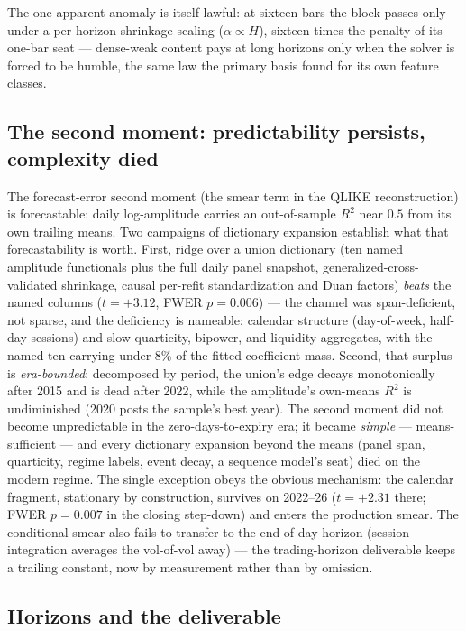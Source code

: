 The one apparent anomaly is itself lawful: at sixteen bars the block passes
only under a per-horizon shrinkage scaling ($\alpha \propto H$), sixteen times
the penalty of its one-bar seat --- dense-weak content pays at long horizons
only when the solver is forced to be humble, the same law the primary basis
found for its own feature classes.

\subsection{The second moment: predictability persists, complexity died}
\label{sec:second-moment}

The forecast-error second moment (the smear term in the QLIKE
reconstruction) is forecastable: daily log-amplitude carries an
out-of-sample $R^2$ near $0.5$ from its own trailing means. Two campaigns of
dictionary expansion establish what that forecastability is worth. First,
ridge over a union dictionary (ten named amplitude functionals plus the full
daily panel snapshot, generalized-cross-validated shrinkage, causal
per-refit standardization and Duan factors) \emph{beats} the named columns
($t = +3.12$, FWER $p = 0.006$) --- the channel was span-deficient, not
sparse, and the deficiency is nameable: calendar structure (day-of-week,
half-day sessions) and slow quarticity, bipower, and liquidity aggregates,
with the named ten carrying under 8\% of the fitted coefficient mass. Second,
that surplus is \emph{era-bounded}: decomposed by period, the union's edge
decays monotonically after 2015 and is dead after 2022, while the amplitude's
own-means $R^2$ is undiminished (2020 posts the sample's best year). The
second moment did not become unpredictable in the zero-days-to-expiry era; it
became \emph{simple} --- means-sufficient --- and every dictionary expansion
beyond the means (panel span, quarticity, regime labels, event decay, a
sequence model's seat) died on the modern regime. The single exception obeys
the obvious mechanism: the calendar fragment, stationary by construction,
survives on 2022--26 ($t = +2.31$ there; FWER $p = 0.007$ in the closing
step-down) and enters the production smear. The conditional smear also fails
to transfer to the end-of-day horizon (session integration averages the
vol-of-vol away) --- the trading-horizon deliverable keeps a trailing
constant, now by measurement rather than by omission.

\subsection{Horizons and the deliverable}
\label{sec:horizons}


